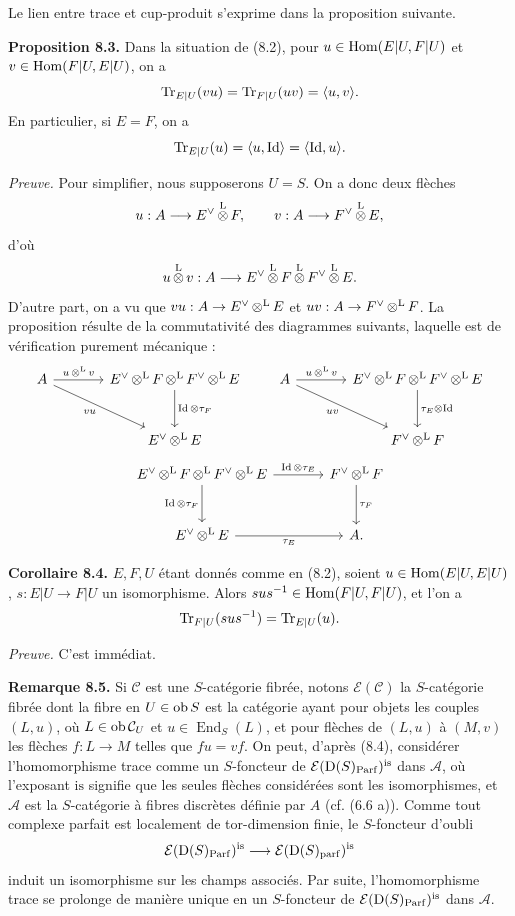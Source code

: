 \documentclass[11pt]{article}
\newcommand{\Parf}{\operatorname{Parf}}
\begin{document}
Le lien entre trace et cup-produit s'exprime dans la proposition suivante.

\textbf{Proposition 8.3.} Dans la situation de (8.2), pour \(u\in\operatorname{Hom}(E|U,F|U)\) et \(v\in\operatorname{Hom}(F|U,E|U)\), on a
\[
  \operatorname{Tr}_{E|U}(vu)=\operatorname{Tr}_{F|U}(uv)=\langle u,v\rangle.
\]
En particulier, si \(E=F\), on a
\[
  \operatorname{Tr}_{E|U}(u)=\langle u,\operatorname{Id}\rangle=\langle\operatorname{Id},u\rangle.
\]

\emph{Preuve.} Pour simplifier, nous supposerons \(U=S\). On a donc deux flèches
\[
  u:A\longrightarrow E^\vee\mathop{\otimes}^{\mathrm L} F,
  \qquad
  v:A\longrightarrow F^\vee\mathop{\otimes}^{\mathrm L} E,
\]
d'où
\[
  u\mathop{\otimes}^{\mathrm L} v:A\longrightarrow E^\vee\mathop{\otimes}^{\mathrm L} F\mathop{\otimes}^{\mathrm L} F^\vee\mathop{\otimes}^{\mathrm L} E.
\]
D'autre part, on a vu que \(vu:A\to E^\vee\mathop{\otimes}^{\mathrm L} E\) et \(uv:A\to F^\vee\mathop{\otimes}^{\mathrm L} F\). La proposition résulte de la commutativité des diagrammes suivants, laquelle est de vérification purement mécanique :
\[
\begin{tikzcd}[column sep=large,row sep=large]
 A \arrow[r,"u\otL v"] \arrow[dr,"vu"'] & E^\vee\otL F\otL F^\vee\otL E \arrow[d,"\Id\otimes\tau_F"] \\
 & E^\vee\otL E
\end{tikzcd}
\qquad
\begin{tikzcd}[column sep=large,row sep=large]
 A \arrow[r,"u\otL v"] \arrow[dr,"uv"'] & E^\vee\otL F\otL F^\vee\otL E \arrow[d,"\tau_E\otimes\Id"] \\
 & F^\vee\otL F
\end{tikzcd}
\]
\[
\begin{tikzcd}[column sep=large,row sep=large]
E^\vee\otL F\otL F^\vee\otL E \arrow[r,"\Id\otimes\tau_E"] \arrow[d,"\Id\otimes\tau_F"'] & F^\vee\otL F \arrow[d,"\tau_F"]\\
E^\vee\otL E \arrow[r,"\tau_E"'] & A .
\end{tikzcd}
\]

\textbf{Corollaire 8.4.} \(E,F,U\) étant donnés comme en (8.2), soient \(u\in\operatorname{Hom}(E|U,E|U)\), \(s:E|U\to F|U\) un isomorphisme. Alors \(sus^{-1}\in\operatorname{Hom}(F|U,F|U)\), et l'on a
\[
  \operatorname{Tr}_{F|U}(sus^{-1})=\operatorname{Tr}_{E|U}(u).
\]

\emph{Preuve.} C'est immédiat.

\textbf{Remarque 8.5.} Si \(\mathcal C\) est une \(S\)-catégorie fibrée, notons \(\mathcal E(\mathcal C)\) la \(S\)-catégorie fibrée dont la fibre en \(U\in\operatorname{ob} S\) est la catégorie ayant pour objets les couples \((L,u)\), où \(L\in\operatorname{ob}\mathcal C_U\) et \(u\in\operatorname{End}_S(L)\), et pour flèches de \((L,u)\) à \((M,v)\) les flèches \(f:L\to M\) telles que \(fu=vf\). On peut, d'après (8.4), considérer l'homomorphisme trace comme un \(S\)-foncteur de \(\mathcal E(\Dpx(S)_{\Parf})^{\mathrm{is}}\) dans \(\mathcal A\), où l'exposant \(\mathrm{is}\) signifie que les seules flèches considérées sont les isomorphismes, et \(\mathcal A\) est la \(S\)-catégorie à fibres discrètes définie par \(A\) (cf. (6.6 a)). Comme tout complexe parfait est localement de tor-dimension finie, le \(S\)-foncteur d'oubli
\[
  \mathcal E(\Dpx(S)_{\Parf})^{\mathrm{is}}
  \longrightarrow
  \mathcal E(\Dpx(S)_{\parf})^{\mathrm{is}}
\]
induit un isomorphisme sur les champs associés. Par suite, l'homomorphisme trace se prolonge de manière unique en un \(S\)-foncteur de \(\mathcal E(\Dpx(S)_{\Parf})^{\mathrm{is}}\) dans \(\mathcal A\).
\end{document}
